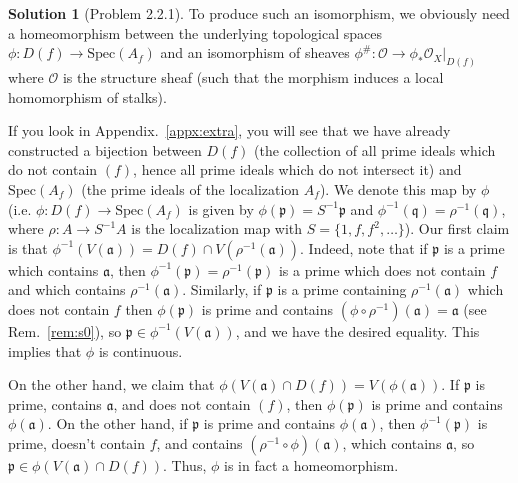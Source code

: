 \documentclass[aps,pra,showpacs,notitlepage,onecolumn,superscriptaddress,nofootinbib]{revtex4-1}
\theoremstyle{definition}
\newtheorem{solution}{Solution}[section]
\begin{document}
\begin{solution}[Problem 2.2.1]
  To produce such an isomorphism, we obviously need a homeomorphism between the underlying topological spaces
  $\phi : D(f) \rightarrow \text{Spec}(A_f)$ and an isomorphism of sheaves $\phi^{\#} : \mathcal{O} \rightarrow \phi_{*} \mathcal{O}_X|_{D(f)}$
  where $\mathcal{O}$ is the structure sheaf (such that the morphism induces a local homomorphism of stalks).

  If you look in Appendix.~\ref{appx:extra}, you will see that we have already constructed a bijection between $D(f)$ (the collection of all prime ideals which do not contain $(f)$, hence all prime
  ideals which do not intersect it) and $\text{Spec}(A_f)$
  (the prime ideals of the localization $A_f$). We denote this map by $\phi$ (i.e. $\phi : D(f) \rightarrow \text{Spec}(A_f)$ is given by $\phi(\mathfrak{p}) = S^{-1} \mathfrak{p}$ and $\phi^{-1}(\mathfrak{q}) = \rho^{-1}(\mathfrak{q})$,
  where $\rho : A \rightarrow S^{-1} A$ is the localization map with $S = \{1, f, f^2, \dots\}$). Our first claim is that $\phi^{-1}(V(\mathfrak{a})) = D(f) \cap V(\rho^{-1}(\mathfrak{a}))$. Indeed, note that if $\mathfrak{p}$ is a prime
  which contains $\mathfrak{a}$, then $\phi^{-1}(\mathfrak{p}) = \rho^{-1}(\mathfrak{p})$ is a prime which does not contain $f$ and which contains $\rho^{-1}(\mathfrak{a})$. Similarly, if $\mathfrak{p}$ is a prime containing
  $\rho^{-1}(\mathfrak{a})$ which does not contain $f$ then $\phi(\mathfrak{p})$ is prime and contains $(\phi \circ \rho^{-1})(\mathfrak{a}) = \mathfrak{a}$ (see Rem.~\ref{rem:s0}),
  so $\mathfrak{p} \in \phi^{-1}(V(\mathfrak{a}))$, and we have the desired equality. This implies that $\phi$ is continuous.

  On the other hand, we claim that $\phi(V(\mathfrak{a}) \cap D(f)) = V(\phi(\mathfrak{a}))$. If $\mathfrak{p}$ is prime, contains $\mathfrak{a}$, and does not contain $(f)$, then
  $\phi(\mathfrak{p})$ is prime and contains $\phi(\mathfrak{a})$. On the other hand, if $\mathfrak{p}$ is prime and contains $\phi(\mathfrak{a})$, then $\phi^{-1}(\mathfrak{p})$ is prime, doesn't contain $f$, and contains
  $(\rho^{-1} \circ \phi)(\mathfrak{a})$, which contains $\mathfrak{a}$, so $\mathfrak{p} \in \phi(V(\mathfrak{a}) \cap D(f))$. Thus, $\phi$ is in fact a homeomorphism.
  \newline


\end{solution}
\end{document}
